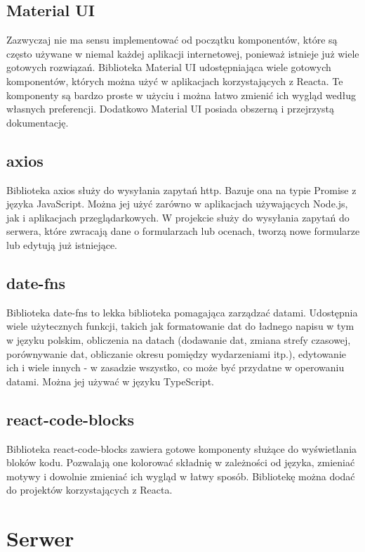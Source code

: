 \subsection{Material UI}
Zazwyczaj nie ma sensu implementować od początku komponentów,
które są często używane w niemal każdej aplikacji internetowej, ponieważ istnieje już
wiele gotowych rozwiązań. Biblioteka Material UI\cite{MaterialUI} udostępniająca wiele
gotowych komponentów, których można użyć w aplikacjach korzystających z Reacta. 
Te komponenty są bardzo proste w użyciu i
można łatwo zmienić ich wygląd według własnych preferencji.
Dodatkowo Material UI posiada obszerną i przejrzystą dokumentację.

\subsection{axios}
Biblioteka axios\cite{axios} służy do wysyłania zapytań http. Bazuje ona na typie Promise z języka
JavaScript. Można jej użyć zarówno w aplikacjach używających Node.js, jak i
aplikacjach przeglądarkowych. W projekcie służy do wysyłania zapytań do serwera,
które zwracają dane o formularzach lub ocenach, tworzą nowe formularze lub 
edytują już istniejące.

\subsection{date-fns}
Biblioteka date-fns\cite{date-fns} to lekka biblioteka pomagająca zarządzać datami.
Udostępnia wiele użytecznych funkcji, takich jak formatowanie dat do 
ładnego napisu w tym w języku polskim, obliczenia na datach (dodawanie dat, zmiana strefy czasowej,
porównywanie dat, obliczanie okresu pomiędzy wydarzeniami itp.), edytowanie ich i wiele 
innych - w zasadzie wszystko, co może być przydatne w operowaniu datami. 
Można jej używać w języku TypeScript. 

\subsection{react-code-blocks}
Biblioteka react-code-blocks\cite{react-code-blocks} zawiera gotowe komponenty 
służące do wyświetlania bloków kodu. Pozwalają one kolorować składnię w zależności
od języka, zmieniać motywy i dowolnie zmieniać ich wygląd w łatwy sposób. Bibliotekę
można dodać do projektów korzystających z Reacta.  

\section{Serwer}

